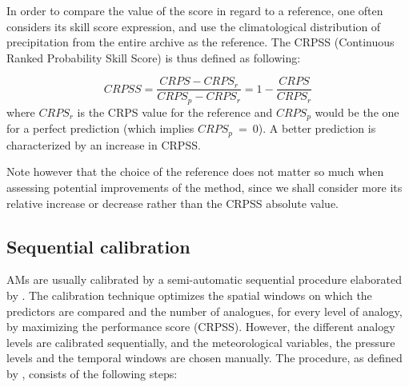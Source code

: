 \documentclass[review]{elsarticle}
\begin{document}
In order to compare the value of the score in regard to a reference, one often considers its skill score expression, and use the climatological distribution of precipitation from the entire archive as the reference. The CRPSS (Continuous Ranked Probability Skill Score) is thus defined as following:

\begin{equation}
\label{eq:CRPSS}
CRPSS = \frac{CRPS-CRPS_{r}}{CRPS_{p}-CRPS_{r}} = 1-\frac{CRPS}{CRPS_{r}}
\end{equation}
where $CRPS_{r}$ is the CRPS value for the reference and $CRPS_{p}$ would be the one for a perfect prediction (which implies $CRPS_{p}~=~0$). A better prediction is characterized by an increase in CRPSS.

Note however that the choice of the reference does not matter so much when assessing potential improvements of the method, since we shall consider more its relative increase or decrease rather than the CRPSS absolute value.

\subsection{Sequential calibration}
\label{sec:sequential}

AMs are usually calibrated by a semi-automatic sequential procedure elaborated by \citet{Bontron2004} \cite[see also ][]{Radanovics2013, BenDaoud2016}. The calibration technique optimizes the spatial windows on which the predictors are compared and the number of analogues, for every level of analogy, by maximizing the performance score (CRPSS). However, the different analogy levels are calibrated sequentially, and the meteorological variables, the pressure levels and the temporal windows are chosen manually. The procedure, as defined by \citet{Bontron2004}, consists of the following steps:
\end{document}
